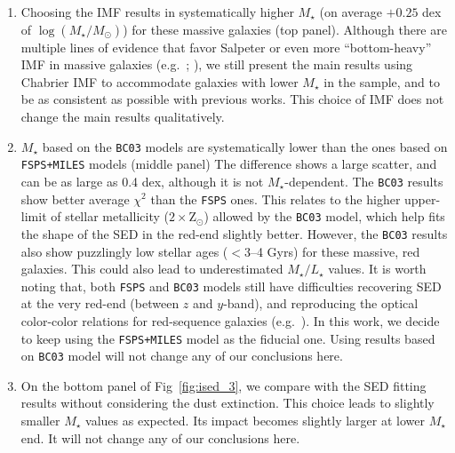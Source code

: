\documentclass[a4paper,fleqn,usenatbib]{mnras}
\def\mstar{{$M_{\star}$}}
\def\logms{{$\log (M_{\star}/M_{\odot})$}}
\def\m2l{{$M_{\star}/L_{\star}$}}
\begin{document}
    \begin{enumerate}

        \item Choosing the \citet{Salpeter1955} IMF results in systematically 
            higher \mstar{} (on average $+0.25$ dex of \logms{}) for these massive 
            galaxies (top panel).
            Although there are multiple lines of evidence that favor Salpeter 
            or even more ``bottom-heavy'' IMF in massive galaxies 
            (e.g.\ \citealt{Conroy2012}; \citealt{Cappellari2012}), we still 
            present the main results using Chabrier IMF to accommodate galaxies 
            with lower \mstar{} in the sample, and to be as consistent as possible 
            with previous works.  
            This choice of IMF does not change the main results qualitatively. 

        \item \mstar{} based on the \texttt{BC03} models are systematically lower 
            than the ones based on \texttt{FSPS+MILES} models (middle panel)
            The difference shows a large scatter, and can be as large as 0.4 dex,
            although it is not \mstar{}-dependent. 
            The \texttt{BC03} results show better average ${\chi}^2$ than the 
            \texttt{FSPS} ones. 
            This relates to the higher upper-limit of stellar metallicity 
            ($2 \times \mathrm{Z}_{\odot}$) allowed by the \texttt{BC03} model, 
            which help fits the shape of the SED in the red-end slightly better.  
            However, the \texttt{BC03} results also show puzzlingly low stellar 
            ages ($< 3$--4 Gyrs) for these massive, red galaxies. 
            This could also lead to underestimated \m2l{} values.
            It is worth noting that, both \texttt{FSPS} and \texttt{BC03} 
            models still have difficulties recovering SED at the very red-end 
            (between $z$ and $y$-band), and reproducing the optical color-color 
            relations for red-sequence galaxies (e.g.\ \citealt{MIUSCAT2}).
            In this work, we decide to keep using the \texttt{FSPS+MILES} model as 
            the fiducial one.  
            Using results based on \texttt{BC03} model will not change any of our 
            conclusions here.
            
        \item On the bottom panel of Fig~\ref{fig:ised_3}, we compare with the
            SED fitting results without considering the dust extinction. 
            This choice leads to slightly smaller \mstar{} values as expected. 
            Its impact becomes slightly larger at lower \mstar{} end. 
            It will not change any of our conclusions here.
          
    \end{enumerate}
     
\end{document}
